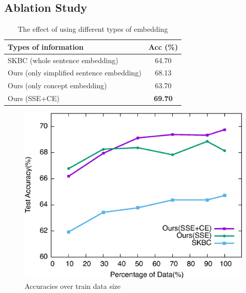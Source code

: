  
\subsection{Ablation Study}
\label{sec:ablation}
\begin{table}[th!]
\small
\centering
\begin{tabular}{lc}
\hline
\textbf{Types of information} & Acc (\%)\\
\hline \hline
SKBC (whole sentence embedding)& 64.70 \\
\hline
Ours (only simplified sentence embedding)& 68.13 \\
Ours (only concept embedding)&  63.70\\
\hline
Ours (SSE+CE)& {\bf 69.70}\\
\hline
\end{tabular}
\caption{The effect of using different types of embedding}
\label{tab:ablation}
\end{table}

\begin{figure}[th!]
\centering\includegraphics[width=0.8\columnwidth]{pictures/trend}
\caption{Accuracies over train data size}\label{fig:trend}
\end{figure}

